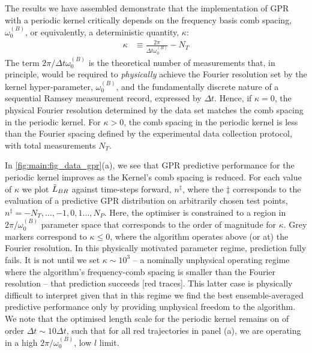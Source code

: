 The results we have assembled demonstrate that the implementation of GPR with a periodic kernel critically depends on the frequency basis comb spacing, $\omega_0^{(B)}$, or equivalently, a deterministic quantity, $\kappa$:
\begin{align}
	\kappa & \equiv \frac{2\pi}{\Delta t \omega_0^{(B)}} - N_T 
\end{align}
The term $ 2\pi /  \Delta t \omega_0^{(B)}$ is the theoretical number of measurements that, in principle, would be required to \emph{physically} achieve the Fourier resolution set by the kernel hyper-parameter, $\omega_0^{(B)}$, and the fundamentally discrete nature of a sequential Ramsey measurement record, expressed by $\Delta t$. Hence, if $\kappa = 0$, the physical Fourier resolution determined by the data set matches the comb spacing in the periodic kernel. For $\kappa > 0$, the comb spacing in the periodic kernel is less than the Fourier spacing defined by the experimental data collection protocol, with total measurements $N_T$. 

In \cref{fig:main:fig_data_gpr}(a), we see that GPR predictive performance for the periodic kernel improves as the Kernel's comb spacing is reduced. For each value of $\kappa$ we plot $\tilde{L}_{BR}$ against time-steps forward, $n^\ddagger$, where the $\ddagger$ corresponds to the evaluation of a predictive GPR distribution on arbitrarily chosen test points, $n^\ddagger = -N_T, \hdots, -1, 0, 1 \hdots, N_P$. Here, the optimiser is constrained to a region in $2\pi/ \omega_0^{(B)}$ parameter space that corresponds to the order of magnitude for $\kappa$. Grey markers correspond to $\kappa \leq 0$, where the algorithm operates above (or at) the Fourier resolution.  In this physically motivated parameter regime, prediction fully fails.  It is not until we set $\kappa\sim10^{3}$ -- a nominally unphysical operating regime where the algorithm's frequency-comb spacing is smaller than the Fourier resolution -- that prediction succeeds [red traces]. This latter case is physically difficult to interpret given that in this regime we find the best ensemble-averaged predictive performance only by providing unphysical freedom to the algorithm.  We note that the optimised length scale for the periodic kernel remains on of order $ \Delta t \sim 10 \Delta t$, such that for all red trajectories in panel (a), we are operating in a high $2\pi/ \omega_0^{(B)}$, low $l$ limit. 

